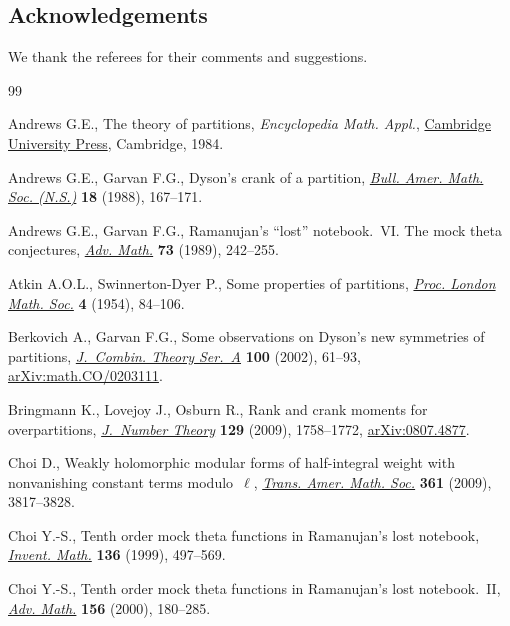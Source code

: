 \documentclass[pdftex]{sigma}
\numberwithin{equation}{section}
\begin{document}
\subsection*{Acknowledgements}
We thank the referees for their comments and suggestions.

\begin{thebibliography}{99}
\footnotesize\itemsep=0pt

Andrews G.E., The theory of partitions, \textit{Encyclopedia Math. Appl.}, \href{https://doi.org/10.1017/CBO9780511608650}{Cambridge University Press}, Cambridge, 1984.

Andrews G.E., Garvan F.G., Dyson's crank of a partition, \href{https://doi.org/10.1090/S0273-0979-1988-15637-6}{\textit{Bull. Amer.
  Math. Soc. (N.S.)}} \textbf{18} (1988), 167--171.

Andrews G.E., Garvan F.G., Ramanujan's ``lost'' notebook.~{VI}. {T}he mock
  theta conjectures, \href{https://doi.org/10.1016/0001-8708(89)90070-4}{\textit{Adv. Math.}} \textbf{73} (1989), 242--255.

Atkin A.O.L., Swinnerton-Dyer P., Some properties of partitions, \href{https://doi.org/10.1112/plms/s3-4.1.84}{\textit{Proc.
  London Math. Soc.}} \textbf{4} (1954), 84--106.

Berkovich A., Garvan F.G., Some observations on {D}yson's new symmetries of
  partitions, \href{https://doi.org/10.1006/jcta.2002.3281}{\textit{J.~Combin. Theory Ser.~A}} \textbf{100} (2002), 61--93,
  \href{https://arxiv.org/abs/math.CO/0203111}{arXiv:math.CO/0203111}.

Bringmann K., Lovejoy J., Osburn R., Rank and crank moments for overpartitions,
  \href{https://doi.org/10.1016/j.jnt.2008.10.017}{\textit{J.~Number Theory}} \textbf{129} (2009), 1758--1772,
  \href{https://arxiv.org/abs/0807.4877}{arXiv:0807.4877}.

Choi D., Weakly holomorphic modular forms of half-integral weight with
  nonvanishing constant terms modulo~$\ell$, \href{https://doi.org/10.1090/S0002-9947-09-04708-4}{\textit{Trans. Amer. Math. Soc.}}
  \textbf{361} (2009), 3817--3828.

Choi Y.-S., Tenth order mock theta functions in {R}amanujan's lost notebook,
  \href{https://doi.org/10.1007/s002220050318}{\textit{Invent. Math.}} \textbf{136} (1999), 497--569.

Choi Y.-S., Tenth order mock theta functions in {R}amanujan's lost
  notebook.~{II}, \href{https://doi.org/10.1006/aima.2000.1948}{\textit{Adv. Math.}} \textbf{156} (2000), 180--285.


\end{thebibliography}
\end{document}

